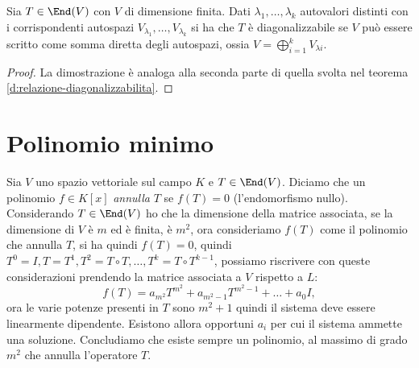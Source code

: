 \begin{teorema}
	Sia $T\in \End(V)$ con $V$ di dimensione finita.
	Dati $\lambda_1,\dots,\lambda_k$ autovalori distinti con i corrispondenti autospazi $V_{\lambda_1},\dots,V_{\lambda_k}$ si ha che $T$ è diagonalizzabile se $V$ può essere scritto come somma diretta degli autospazi, ossia $V =\bigoplus_{i=1}^k V_{\lambda i}$.
\end{teorema}
\begin{proof}
	La dimostrazione è analoga alla seconda parte di quella svolta nel teorema \ref{d:relazione-diagonalizzabilita}.
\end{proof}

\section{Polinomio minimo}
Sia $V$ uno spazio vettoriale sul campo $K$ e $T\in \End(V)$.
Diciamo che un polinomio $f\in K[x]$ \emph{annulla} $T$ se $f(T) = 0$ (l'endomorfismo nullo).
Considerando $T\in \End(V)$ ho che la dimensione della matrice associata, se la dimensione di $V$ è $m$ ed è finita, è $m^2$, ora consideriamo $f(T)$ come il polinomio che annulla $T$, si ha quindi $f(T) = 0$, quindi $T^0 = I,T=T^1, T^2=T\circ T, \dots, T^k = T\circ T^{k-1}$, possiamo riscrivere con queste considerazioni prendendo la matrice associata a $V$ rispetto a $L$:
\begin{equation*}
	f(T) = a_{m^2}T^{m^2} +a_{m^2-1}T^{m^2-1}+\dots+a_0I,
\end{equation*}
ora le varie potenze presenti in $T$ sono $m^2+1$ quindi il sistema deve essere linearmente dipendente.
Esistono allora opportuni $a_i$ per cui il sistema ammette una soluzione.
Concludiamo che esiste sempre un polinomio, al massimo di grado $m^2$ che annulla l'operatore $T$.

